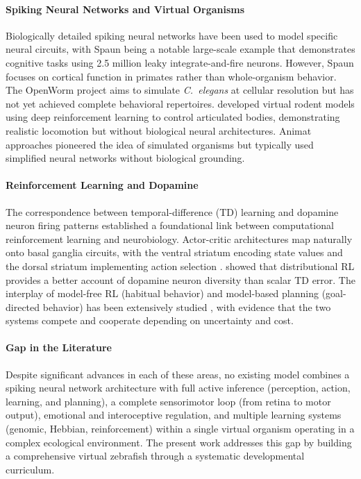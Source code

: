\documentclass[12pt]{article}
\begin{document}
\paragraph{Spiking Neural Networks and Virtual Organisms}

Biologically detailed spiking neural networks have been used to model
specific neural circuits, with Spaun \citep{eliasmith2012} being a
notable large-scale example that demonstrates cognitive tasks using
2.5 million leaky integrate-and-fire neurons.
However, Spaun focuses on cortical function in primates rather than
whole-organism behavior.
The OpenWorm project \citep{openworm2014} aims to simulate
\textit{C.\ elegans} at cellular resolution but has not yet achieved
complete behavioral repertoires.
\citet{merel2019} developed virtual rodent models using deep
reinforcement learning to control articulated bodies, demonstrating
realistic locomotion but without biological neural architectures.
Animat approaches \citep{wilson1991} pioneered the idea of simulated
organisms but typically used simplified neural networks without
biological grounding.

\paragraph{Reinforcement Learning and Dopamine}

\begin{sloppypar}
The correspondence between temporal-difference (TD) learning
\citep{sutton2018} and dopamine neuron firing patterns
\citep{schultz1997} established a foundational link between
computational reinforcement learning and neurobiology.
Actor-critic architectures map naturally onto basal ganglia circuits,
with the ventral striatum encoding state values and the dorsal
striatum implementing action selection \citep{oquist2004}.
\citet{dabney2020} showed that distributional RL provides a
better account of dopamine neuron diversity than scalar TD error.
The interplay of model-free RL (habitual behavior) and model-based
planning (goal-directed behavior) has been extensively studied
\citep{daw2011}, with evidence that the two systems compete and
cooperate depending on uncertainty and cost.
\end{sloppypar}

\paragraph{Gap in the Literature}

Despite significant advances in each of these areas, no existing model
combines a spiking neural network architecture with full active
inference (perception, action, learning, and planning), a complete
sensorimotor loop (from retina to motor output), emotional and
interoceptive regulation, and multiple learning systems (genomic,
Hebbian, reinforcement) within a single virtual organism operating
in a complex ecological environment.
The present work addresses this gap by building a comprehensive virtual
zebrafish through a systematic developmental curriculum.
\end{document}
